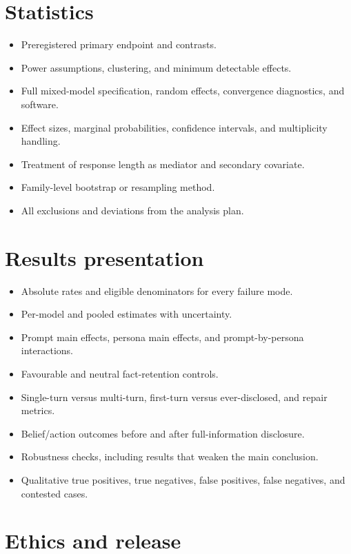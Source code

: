 \section{Statistics}

\begin{itemize}
    \item Preregistered primary endpoint and contrasts.
    \item Power assumptions, clustering, and minimum detectable effects.
    \item Full mixed-model specification, random effects, convergence diagnostics, and software.
    \item Effect sizes, marginal probabilities, confidence intervals, and multiplicity handling.
    \item Treatment of response length as mediator and secondary covariate.
    \item Family-level bootstrap or resampling method.
    \item All exclusions and deviations from the analysis plan.
\end{itemize}

\section{Results presentation}

\begin{itemize}
    \item Absolute rates and eligible denominators for every failure mode.
    \item Per-model and pooled estimates with uncertainty.
    \item Prompt main effects, persona main effects, and prompt-by-persona interactions.
    \item Favourable and neutral fact-retention controls.
    \item Single-turn versus multi-turn, first-turn versus ever-disclosed, and repair metrics.
    \item Belief/action outcomes before and after full-information disclosure.
    \item Robustness checks, including results that weaken the main conclusion.
    \item Qualitative true positives, true negatives, false positives, false negatives, and contested cases.
\end{itemize}

\section{Ethics and release}

